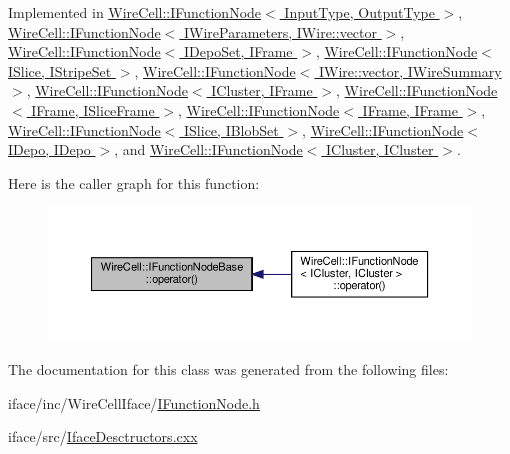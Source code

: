 Implemented in \hyperlink{class_wire_cell_1_1_i_function_node_a93547dd6b1a2a44dfc9d5fb458d2ef04}{Wire\+Cell\+::\+I\+Function\+Node$<$ Input\+Type, Output\+Type $>$}, \hyperlink{class_wire_cell_1_1_i_function_node_a93547dd6b1a2a44dfc9d5fb458d2ef04}{Wire\+Cell\+::\+I\+Function\+Node$<$ I\+Wire\+Parameters, I\+Wire\+::vector $>$}, \hyperlink{class_wire_cell_1_1_i_function_node_a93547dd6b1a2a44dfc9d5fb458d2ef04}{Wire\+Cell\+::\+I\+Function\+Node$<$ I\+Depo\+Set, I\+Frame $>$}, \hyperlink{class_wire_cell_1_1_i_function_node_a93547dd6b1a2a44dfc9d5fb458d2ef04}{Wire\+Cell\+::\+I\+Function\+Node$<$ I\+Slice, I\+Stripe\+Set $>$}, \hyperlink{class_wire_cell_1_1_i_function_node_a93547dd6b1a2a44dfc9d5fb458d2ef04}{Wire\+Cell\+::\+I\+Function\+Node$<$ I\+Wire\+::vector, I\+Wire\+Summary $>$}, \hyperlink{class_wire_cell_1_1_i_function_node_a93547dd6b1a2a44dfc9d5fb458d2ef04}{Wire\+Cell\+::\+I\+Function\+Node$<$ I\+Cluster, I\+Frame $>$}, \hyperlink{class_wire_cell_1_1_i_function_node_a93547dd6b1a2a44dfc9d5fb458d2ef04}{Wire\+Cell\+::\+I\+Function\+Node$<$ I\+Frame, I\+Slice\+Frame $>$}, \hyperlink{class_wire_cell_1_1_i_function_node_a93547dd6b1a2a44dfc9d5fb458d2ef04}{Wire\+Cell\+::\+I\+Function\+Node$<$ I\+Frame, I\+Frame $>$}, \hyperlink{class_wire_cell_1_1_i_function_node_a93547dd6b1a2a44dfc9d5fb458d2ef04}{Wire\+Cell\+::\+I\+Function\+Node$<$ I\+Slice, I\+Blob\+Set $>$}, \hyperlink{class_wire_cell_1_1_i_function_node_a93547dd6b1a2a44dfc9d5fb458d2ef04}{Wire\+Cell\+::\+I\+Function\+Node$<$ I\+Depo, I\+Depo $>$}, and \hyperlink{class_wire_cell_1_1_i_function_node_a93547dd6b1a2a44dfc9d5fb458d2ef04}{Wire\+Cell\+::\+I\+Function\+Node$<$ I\+Cluster, I\+Cluster $>$}.

Here is the caller graph for this function\+:
\nopagebreak
\begin{figure}[H]
\begin{center}
\leavevmode
\includegraphics[width=350pt]{class_wire_cell_1_1_i_function_node_base_a8928d96f5d2030a52a490cf1d71c096f_icgraph}
\end{center}
\end{figure}


The documentation for this class was generated from the following files\+:\begin{DoxyCompactItemize}
\item 
iface/inc/\+Wire\+Cell\+Iface/\hyperlink{_i_function_node_8h}{I\+Function\+Node.\+h}\item 
iface/src/\hyperlink{_iface_desctructors_8cxx}{Iface\+Desctructors.\+cxx}\end{DoxyCompactItemize}
